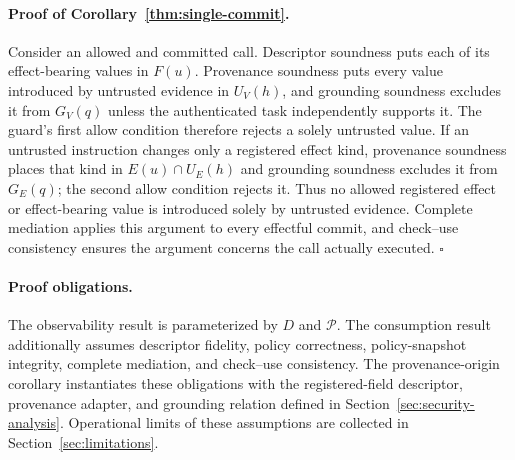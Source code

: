 \paragraph{Proof of Corollary~\ref{thm:single-commit}.}
Consider an allowed and committed call.  Descriptor soundness puts each of its
effect-bearing values in $F(u)$. Provenance soundness puts every value
introduced by untrusted evidence in $U_V(h)$, and grounding soundness excludes
it from $G_V(q)$ unless the authenticated task independently supports it.  The
guard's first allow condition therefore rejects a solely untrusted value.  If
an untrusted instruction changes only a registered effect kind, provenance
soundness places that kind in $E(u)\cap U_E(h)$ and grounding soundness excludes
it from $G_E(q)$; the second allow condition rejects it.  Thus no allowed
registered effect or effect-bearing value is introduced solely by untrusted
evidence.
Complete mediation applies this argument to every effectful commit, and
check--use consistency ensures the argument concerns the call actually
executed. \hfill$\square$

\paragraph{Proof obligations.}
The observability result is parameterized by $D$ and $\mathcal P$. The
consumption result additionally assumes descriptor fidelity, policy
correctness, policy-snapshot integrity, complete mediation, and check--use
consistency. The provenance-origin corollary instantiates these obligations
with the registered-field descriptor, provenance adapter, and grounding
relation defined in Section~\ref{sec:security-analysis}. Operational limits of
these assumptions are collected in Section~\ref{sec:limitations}.
